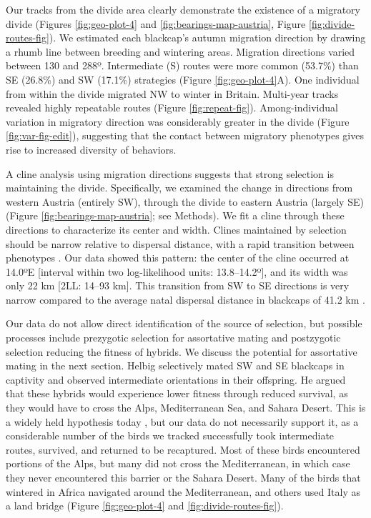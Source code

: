 \documentclass[a4paper, nobind]{templates/ociamthesis}
\begin{document}
Our tracks from the divide area clearly demonstrate the existence of a migratory divide (Figures \ref{fig:geo-plot-4} and \ref{fig:bearings-map-austria}, Figure \ref{fig:divide-routes-fig}). We estimated each blackcap's autumn migration direction by drawing a rhumb line between breeding and wintering areas. Migration directions varied between 130 and 288º. Intermediate (S) routes were more common (53.7\%) than SE (26.8\%) and SW (17.1\%) strategies (Figure \ref{fig:geo-plot-4}A). One individual from within the divide migrated NW to winter in Britain. Multi-year tracks revealed highly repeatable routes (Figure \ref{fig:repeat-fig}). Among-individual variation in migratory direction was considerably greater in the divide (Figure \ref{fig:var-fig-edit}), suggesting that the contact between migratory phenotypes gives rise to increased diversity of behaviors.

A cline analysis using migration directions suggests that strong selection is maintaining the divide. Specifically, we examined the change in directions from western Austria (entirely SW), through the divide to eastern Austria (largely SE) (Figure \ref{fig:bearings-map-austria}; see Methods). We fit a cline through these directions to characterize its center and width. Clines maintained by selection should be narrow relative to dispersal distance, with a rapid transition between phenotypes \autocite{bartonGeneticAnalysisHybrid1993}. Our data showed this pattern: the center of the cline occurred at 14.0ºE {[}interval within two log-likelihood units: 13.8--14.2º{]}, and its width was only 22 km {[}2LL: 14--93 km{]}. This transition from SW to SE directions is very narrow compared to the average natal dispersal distance in blackcaps of 41.2 km \autocite{paradisPatternsNatalBreeding1998}.

Our data do not allow direct identification of the source of selection, but possible processes include prezygotic selection for assortative mating and postzygotic selection reducing the fitness of hybrids. We discuss the potential for assortative mating in the next section. Helbig \autocite*{helbigInheritanceMigratoryDirection1991} selectively mated SW and SE blackcaps in captivity and observed intermediate orientations in their offspring. He argued that these hybrids would experience lower fitness through reduced survival, as they would have to cross the Alps, Mediterranean Sea, and Sahara Desert. This is a widely held hypothesis today \autocite{benschGeneticMorphologicalFeather2009,helbigInheritanceMigratoryDirection1991,irwinSiberianMigratoryDivides2005}, but our data do not necessarily support it, as a considerable number of the birds we tracked successfully took intermediate routes, survived, and returned to be recaptured. Most of these birds encountered portions of the Alps, but many did not cross the Mediterranean, in which case they never encountered this barrier or the Sahara Desert. Many of the birds that wintered in Africa navigated around the Mediterranean, and others used Italy as a land bridge (Figure \ref{fig:geo-plot-4} and \ref{fig:divide-routes-fig}).
\end{document}
